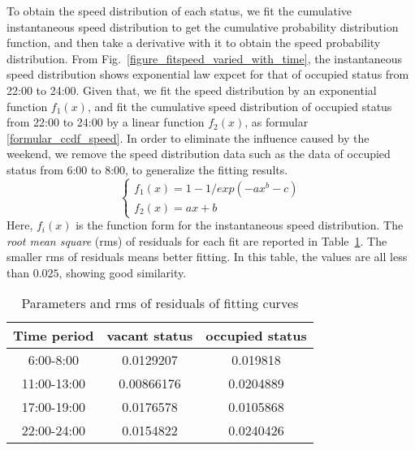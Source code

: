 To obtain the speed distribution of each status, we fit the cumulative instantaneous speed distribution to get the cumulative probability distribution function, and then take a derivative with it to obtain the speed probability distribution. From Fig.~\ref{figure_fitspeed_varied_with_time}, the instantaneous speed distribution shows exponential law expcet for that of occupied status from 22:00 to 24:00. Given that, we fit the speed distribution by an exponential function $f_1(x)$, and fit the cumulative speed distribution of occupied status from 22:00 to 24:00 by a linear function $f_2(x)$, as formular \ref{formular_ccdf_speed}. In order to eliminate the influence caused by the weekend, we remove the speed distribution data such as the data of occupied status from 6:00 to 8:00, to generalize the fitting results. 
\begin{equation}\label{formular_ccdf_speed}
\left\{
\begin{array}{ll}
f_1(x) = 1-1/exp(-ax^b-c)\\
f_2(x) = ax+b
\end{array}
\right.
\end{equation}
Here, $f_i(x)$ is the function form for the instantaneous speed distribution. The \emph{root mean square} (rms) of residuals for each fit are reported in Table~\ref{table_rms}. The smaller rms of residuals means better fitting. In this table, the values are all less than $0.025$, showing good similarity.
\begin{table}[!h]
\caption{Parameters and rms of residuals of fitting curves}\label{table_rms}
\centering
\begin{tabular}{c|c|c}
  \hline
  Time period  & vacant status & occupied status \\
  \hline
6:00-8:00   &0.0129207 & 0.019818 \\
11:00-13:00 &0.00866176 & 0.0204889 \\
17:00-19:00 &0.0176578 & 0.0105868 \\
22:00-24:00 &0.0154822 & 0.0240426 \\
  \hline
\end{tabular}
\end{table}

